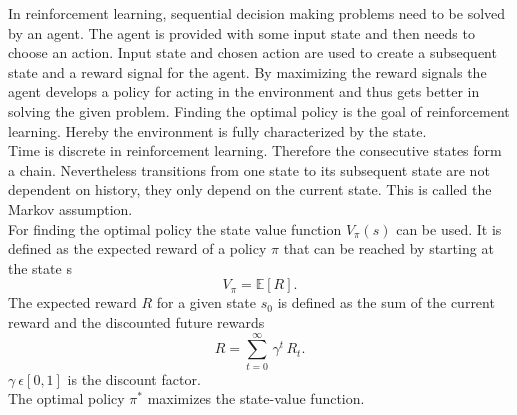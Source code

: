 In reinforcement learning, sequential decision making problems need to be solved by an agent. The agent is provided with some input state and then needs to choose an action. Input state and chosen action are used to create a subsequent state and a reward signal for the agent. By maximizing the reward signals the agent develops a policy for acting in the environment and thus gets better in solving the given problem. Finding the optimal policy is the goal of reinforcement learning.
Hereby the environment is fully characterized by the state. \\
Time is discrete in reinforcement learning. Therefore the consecutive states form a chain.
Nevertheless transitions from one state to its subsequent state are not dependent on history, they only depend on the current state. This is called the Markov assumption. \\
For finding the optimal policy the state value function $V_\pi(s)$ can be used. It is defined as the expected reward of a policy $\pi$ that can be reached by starting at the state s
\begin{equation}
V_\pi=\mathbb{E}\left[R\right].
\end{equation}
The expected reward $R$ for a given state $s_0$ is defined as the sum of the current reward and the discounted future rewards
\begin{equation}
R=\sum^\infty_{t=0}\,\gamma^t\,R_t.
\end{equation}
$\gamma\:\epsilon\left[0,1\right]$ is the discount factor.\\
The optimal policy $\pi^*$ maximizes the state-value function.